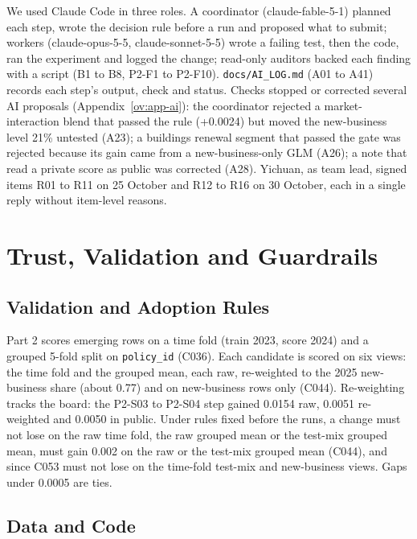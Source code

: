 We used Claude Code in three roles. A coordinator (claude-fable-5-1) planned each step, wrote the decision rule before
a run and proposed what to submit; workers (claude-opus-5-5, claude-sonnet-5-5) wrote a failing test, then the code,
ran the experiment and logged the change; read-only auditors backed each finding with a script (B1 to B8, P2-F1 to
P2-F10). \texttt{docs/AI\_LOG.md} (A01 to A41) records each step's output, check and status. Checks stopped or corrected
several AI proposals (Appendix~\ref{ov:app-ai}): the coordinator rejected a market-interaction blend that passed the rule
(+0.0024) but moved the new-business level 21\% untested (A23); a buildings renewal segment that passed the gate was
rejected because its gain came from a new-business-only GLM (A26); a note that read a private score as public was
corrected (A28). Yichuan, as team lead, signed items R01 to R11 on 25 October and R12 to R16 on 30 October, each in a
single reply without item-level reasons.


\section{Trust, Validation and Guardrails}
\label{ov:trust}

\subsection{Validation and Adoption Rules}

Part 2 scores emerging rows on a time fold (train 2023, score 2024) and a grouped 5-fold split on
\texttt{policy\_id} (C036). Each candidate is scored on six views: the time fold and the grouped mean, each raw, re-weighted to the
2025 new-business share (about 0.77) and on new-business rows only (C044). Re-weighting tracks the board: the P2-S03 to
P2-S04 step gained 0.0154 raw, 0.0051 re-weighted and 0.0050 in public. Under rules fixed before the runs, a
change must not lose on the raw time fold, the raw grouped mean or the test-mix grouped mean, must gain 0.002 on the raw
or the test-mix grouped mean (C044), and since C053 must not lose on the time-fold test-mix and new-business views.
Gaps under 0.0005 are ties.

\subsection{Data and Code}

